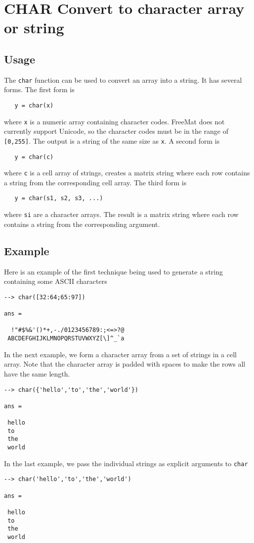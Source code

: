 \section{CHAR Convert to character array or string}

\subsection{Usage}

The \verb|char| function can be used to convert an array
into a string.  It has several forms.  The first form
is
\begin{verbatim}
   y = char(x)
\end{verbatim}
where \verb|x| is a numeric array containing character codes.
FreeMat does not currently support Unicode, so the
character codes must be in the range of \verb|[0,255]|.  The
output is a string of the same size as \verb|x|.  A second
form is
\begin{verbatim}
   y = char(c)
\end{verbatim}
where \verb|c| is a cell array of strings, creates a matrix string
where each row contains a string from the corresponding cell array.
The third form is
\begin{verbatim}
   y = char(s1, s2, s3, ...)
\end{verbatim}
where \verb|si| are a character arrays.  The result is a matrix string
where each row contains a string from the corresponding argument.
\subsection{Example}

Here is an example of the first technique being used to generate
a string containing some ASCII characters
\begin{verbatim}
--> char([32:64;65:97])

ans = 

  !"#$%&'()*+,-./0123456789:;<=>?@
 ABCDEFGHIJKLMNOPQRSTUVWXYZ[\]^_`a
\end{verbatim}
In the next example, we form a character array from a set of
strings in a cell array.  Note that the character array is padded
with spaces to make the rows all have the same length.
\begin{verbatim}
--> char({'hello','to','the','world'})

ans = 

 hello
 to   
 the  
 world
\end{verbatim}
In the last example, we pass the individual strings as explicit
arguments to \verb|char|
\begin{verbatim}
--> char('hello','to','the','world')

ans = 

 hello
 to   
 the  
 world
\end{verbatim}
